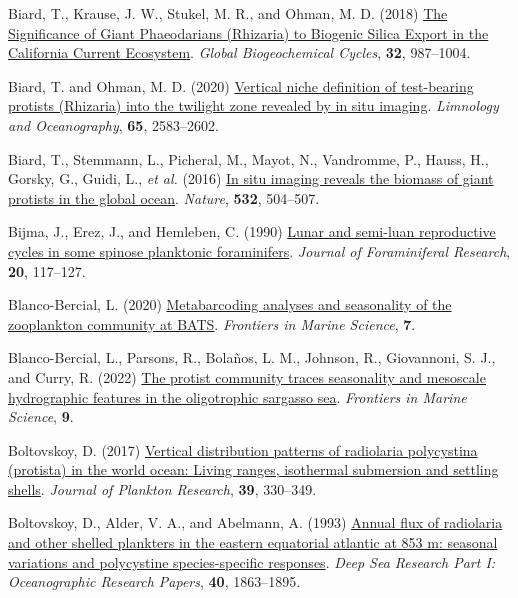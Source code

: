 \documentclass[
]{article}
\newlength{\cslhangindent}
\newlength{\cslentryspacingunit} %
\newenvironment{CSLReferences}[2] %
 {%
  \setlength{\parindent}{0pt}
  \ifodd #1
  \let\oldpar\par
  \def\par{\hangindent=\cslhangindent\oldpar}
  \fi
  \setlength{\parskip}{#2\cslentryspacingunit}
 }%
 {}
\begin{document}
\begin{CSLReferences}{1}{0}
\leavevmode{}%
Biard, T., Krause, J. W., Stukel, M. R., and Ohman, M. D. (2018)
\href{https://doi.org/10.1029/2018GB005877}{The Significance of Giant
Phaeodarians (Rhizaria) to Biogenic Silica Export in the California
Current Ecosystem}. \emph{Global Biogeochemical Cycles}, \textbf{32},
987--1004.

\leavevmode{}%
Biard, T. and Ohman, M. D. (2020)
\href{https://doi.org/10.1002/lno.11472}{Vertical niche definition of
test-bearing protists (Rhizaria) into the twilight zone revealed by in
situ imaging}. \emph{Limnology and Oceanography}, \textbf{65},
2583--2602.

\leavevmode{}%
Biard, T., Stemmann, L., Picheral, M., Mayot, N., Vandromme, P., Hauss,
H., Gorsky, G., Guidi, L., \emph{et al.} (2016)
\href{https://doi.org/10.1038/nature17652}{In situ imaging reveals the
biomass of giant protists in the global ocean}. \emph{Nature},
\textbf{532}, 504--507.

\leavevmode{}%
Bijma, J., Erez, J., and Hemleben, C. (1990)
\href{https://epic.awi.de/id/eprint/6096/1/Bij1990a.pdf}{Lunar and
semi-luan reproductive cycles in some spinose planktonic foraminifers}.
\emph{Journal of Foraminiferal Research}, \textbf{20}, 117--127.

\leavevmode{}%
Blanco-Bercial, L. (2020)
\href{https://www.frontiersin.org/articles/10.3389/fmars.2020.00173}{Metabarcoding
analyses and seasonality of the zooplankton community at BATS}.
\emph{Frontiers in Marine Science}, \textbf{7}.

\leavevmode{}%
Blanco-Bercial, L., Parsons, R., Bolaños, L. M., Johnson, R.,
Giovannoni, S. J., and Curry, R. (2022)
\href{https://www.frontiersin.org/articles/10.3389/fmars.2022.897140}{The
protist community traces seasonality and mesoscale hydrographic features
in the oligotrophic sargasso sea}. \emph{Frontiers in Marine Science},
\textbf{9}.

\leavevmode{}%
Boltovskoy, D. (2017)
\href{https://doi.org/10.1093/plankt/fbx003}{Vertical distribution
patterns of radiolaria polycystina (protista) in the world ocean: Living
ranges, isothermal submersion and settling shells}. \emph{Journal of
Plankton Research}, \textbf{39}, 330--349.

\leavevmode{}%
Boltovskoy, D., Alder, V. A., and Abelmann, A. (1993)
\href{https://doi.org/10.1016/0967-0637(93)90036-3}{Annual flux of
radiolaria and other shelled plankters in the eastern equatorial
atlantic at 853 m: seasonal variations and polycystine species-specific
responses}. \emph{Deep Sea Research Part I: Oceanographic Research
Papers}, \textbf{40}, 1863--1895.


\end{CSLReferences}
\end{document}

